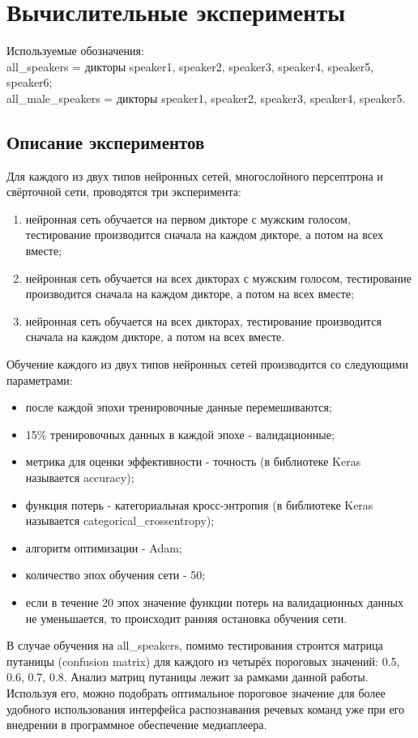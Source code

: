 \section{Вычислительные эксперименты}
Используемые обозначения: \\
all\_speakers = дикторы speaker1, speaker2, speaker3, speaker4, speaker5, speaker6; \\
all\_male\_speakers = дикторы speaker1, speaker2, speaker3, speaker4, speaker5.
\subsection{Описание экспериментов}
Для каждого из двух типов нейронных сетей, многослойного персептрона и свёрточной сети, проводятся три эксперимента:
\begin{enumerate}[leftmargin=2cm]
	\item нейронная сеть обучается на первом дикторе с мужским голосом, тестирование производится сначала на каждом дикторе, а потом на всех вместе;
	\item нейронная сеть обучается на всех дикторах с мужским голосом, тестирование производится сначала на каждом дикторе, а потом на всех вместе;
	\item нейронная сеть обучается на всех дикторах, тестирование производится сначала на каждом дикторе, а потом на всех вместе.
\end{enumerate}

Обучение каждого из двух типов нейронных сетей производится со следующими параметрами:
\begin{itemize}[leftmargin=2cm]
	\item после каждой эпохи тренировочные данные перемешиваются;
	\item 15\% тренировочных данных в каждой эпохе - валидационные;
	\item метрика для оценки эффективности - точность (в библиотеке Keras называется accuracy);
	\item функция потерь - категориальная кросс-энтропия (в библиотеке Keras называется categorical\_crossentropy);
	\item алгоритм оптимизации - Adam;
	\item количество эпох обучения сети - 50;
	\item если в течение 20 эпох значение функции потерь на валидационных данных не уменьшается, то происходит ранняя остановка обучения сети.
\end{itemize}

В случае обучения на all\_speakers, помимо тестирования строится матрица путаницы (confusion matrix) для каждого из четырёх пороговых значений: 0.5, 0.6, 0.7, 0.8. Анализ матриц путаницы лежит за рамками данной работы. Используя его, можно подобрать оптимальное пороговое значение для более удобного использования интерфейса распознавания речевых команд уже при его внедрении в программное обеспечение медиаплеера. 

